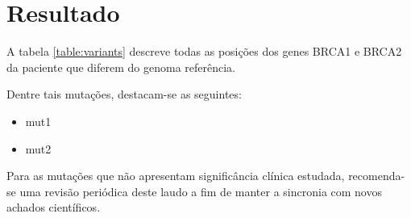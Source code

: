 \section{Resultado}
A tabela \ref{table:variants} descreve todas as posições dos genes BRCA1 e BRCA2 da paciente que diferem
do genoma referência.

Dentre tais mutações, destacam-se as seguintes:
\begin{itemize}
\item mut1
\item mut2
\end{itemize}

Para as mutações que não apresentam significância clínica estudada, recomenda-se uma revisão 
periódica deste laudo a fim de manter a sincronia com novos achados científicos.
